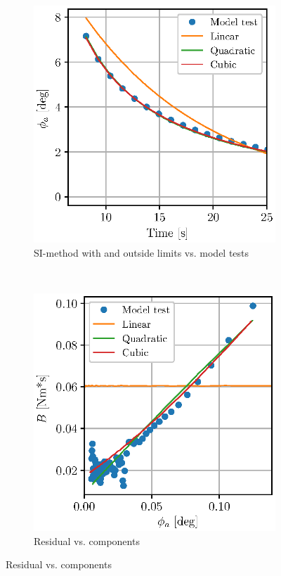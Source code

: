 \begin{figure}[H]
\begin{subfigure}[b]{0.48\textwidth}
        \includegraphics[width=\textwidth]{figures/roll_decay_amplitude.eps}
        \vspace{-0.5cm}
        \caption{SI-method with and outside limits vs. model tests}
        \label{fig:si_model_within}
    \end{subfigure}
        ~ %
    \begin{subfigure}[b]{0.48\textwidth}
        \centering
        \includegraphics[width=\textwidth]{figures/roll_decay_damping.eps}
        \caption{Residual vs. components}
        \label{fig:component_residual}
    \end{subfigure}
    
\end{figure}



